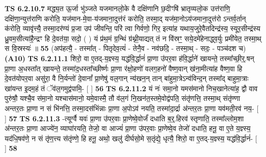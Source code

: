 \documentclass[17pt]{extarticle}
\begin{document}
                                \textbf{ TS 6.2.10.7} \newline
                  मद्ध्य॒त ऊ॒र्जा भु॑ञ्जते यजमानलो॒के वै दक्षि॑णानि छ॒दीꣳषि॑ भ्रातृव्यलो॒क उत्त॑राणि॒ दक्षि॑णा॒न्युत्त॑राणि करोति॒ यज॑मान-मे॒वा-य॑जमाना॒दुत्त॑रं करोति॒ तस्मा॒द् यज॑मा॒नोऽय॑जमाना॒दुत्त॑रो ऽन्तर्व॒र्तान् क॑रोति॒ व्यावृ॑त्त्यै॒ तस्मा॒दर॑ण्यं प्र॒जा उप॑ जीवन्ति॒ परि॑ त्वा गिर्वणो॒ गिर॒ इत्या॑ह यथाय॒जुरे॒वैतदिन्द्र॑स्य॒ स्यूर॒सीन्द्र॑स्य ध्रु॒वम॒सीत्या॑है॒न्द्रꣳ हि दे॒वत॑या॒ सदो॒ ( ) यं प्र॑थ॒मं ग्र॒न्थिं ग्र॑थ्नी॒याद्यत् तं न वि॑स्रꣳ॒॒ सये॒दमे॑हेनाद्ध्व॒र्युः प्रमी॑येत॒ तस्मा॒थ् स वि॒स्रस्यः॑ ॥ \textbf{  55} \newline
                  \newline
                      (अप॑हत्यै॒ - तस्मा᳚त् - पितृदेव॒त्यं॑ - तेनै॒व - नव॑छदि॒ - तस्मा॒थ् - सदः॒ - पञ्च॑दश च)  \textbf{(A10)} \newline \newline
                                        \textbf{ TS 6.2.11.1} \newline
                  शिरो॒ वा ए॒तद्-य॒ज्ञ्स्य॒ यद्ध॑वि॒र्द्धानं॑ प्रा॒णा उ॑पर॒वा ह॑वि॒र्द्धाने॑ खायन्ते॒ तस्मा᳚च्छी॒र्॒.षन् प्रा॒णा अ॒धस्ता᳚त् खायन्ते॒ तस्मा॑द॒धस्ता᳚च्छीर्ष्णः प्रा॒णा र॑क्षो॒हणो॑ वलग॒हनो॑ वैष्ण॒वान् ख॑ना॒मीत्या॑ह वैष्ण॒वा हि दे॒वत॑योपर॒वा असु॑रा॒ वै नि॒र्यन्तो॑ दे॒वानां᳚ प्रा॒णेषु॑ वल॒गान् न्य॑खन॒न् तान् बा॑हुमा॒त्रेऽन्व॑विन्द॒न् तस्मा᳚द् बाहुमा॒त्राः खा॑यन्त इ॒दम॒हं तं ॅव॑ल॒गमुद्व॑पामि॒- [  ] \textbf{  56} \newline
                  \newline
                                \textbf{ TS 6.2.11.2} \newline
                  यं नः॑ समा॒नो यमस॑मानो निच॒खानेत्या॑ह॒ द्वौ वाव पुरु॑षौ॒ यश्चै॒व स॑मा॒नो यश्चास॑मानो॒ यमे॒वास्मै॒ तौ व॑ल॒गं नि॒खन॑त॒स्तमे॒वोद्व॑पति॒ संतृ॑णत्ति॒ तस्मा॒थ् संतृ॑ण्णा अन्तर॒तः प्रा॒णा न सं भि॑नत्ति॒ तस्मा॒दस॑भिंन्नाः प्रा॒णा अ॒पोऽव॑ नयति॒ तस्मा॑दा॒र्द्रा अ॑न्तर॒तः प्रा॒णा यव॑मती॒रव॑ नय॒- [  ] \textbf{  57} \newline
                  \newline
                                \textbf{ TS 6.2.11.3} \newline
                  -त्यूर्ग्वै यवः॑ प्रा॒णा उ॑पर॒वाः प्रा॒णेष्वे॒वोर्जं॑ दधाति ब॒र्॒.हिरव॑ स्तृणाति॒ तस्मा᳚ल्लोम॒शा अ॑न्तर॒तः प्रा॒णा आज्ये॑न॒ व्याघा॑रयति॒ तेजो॒ वा आज्यं॑ प्रा॒णा उ॑पर॒वाः प्रा॒णेष्वे॒व तेजो॑ दधाति॒ हनू॒ वा ए॒ते य॒ज्ञ्स्य॒ यद॑धि॒षव॑णे॒ न सं तृ॑ण॒त्त्य स॑तृंण्णे॒ हि हनू॒ अथो॒ खलु॑ दीर्घसो॒मे स॒तृंद्ये॒ धृत्यै॒ शिरो॒ वा ए॒तद्-य॒ज्ञ्स्य॒ यद्ध॑वि॒र्द्धानं॑- [  ] \textbf{  58} \newline
\end{document}
